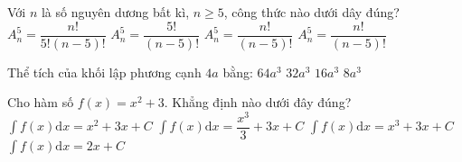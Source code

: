 \begin{ex}%
Với $n$ là số nguyên dương bất kì, $n \geq 5$, công thức nào dưới dây đúng?
\choice
{$A_n^5=\dfrac{n !}{5!(n-5) !}$}
{$A_n^5=\dfrac{5!}{(n-5) !}$}
{\True $A_n^5=\dfrac{n !}{(n-5) !}$}
{$A_n^5=\dfrac{n !}{(n-5) !}$}

\end{ex}
\begin{ex}%
Thể tích của khối lập phương cạnh $4 a$ bằng:
\choice
{\True $64 a^3$}
{$32 a^3$}
{$16 a^3$}
{$8 a^3$}
\end{ex}
\begin{ex}%
Cho hàm số $f(x)=x^2+3$. Khẳng định nào dưới đây đúng?
\choice
{$\displaystyle\int f(x) \mathrm{d} x=x^2+3 x+C$}
{\True $\displaystyle\int f(x) \mathrm{d} x=\dfrac{x^3}{3}+3 x+C$}
{$\displaystyle\int f(x) \mathrm{d} x=x^3+3 x+C$}
{$\displaystyle\int f(x) \mathrm{d} x=2 x+C$}
\end{ex}

